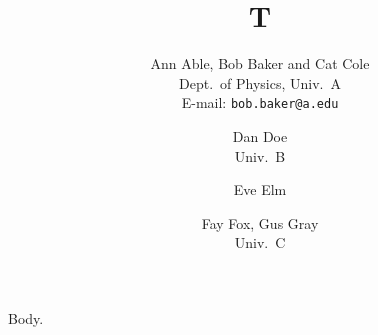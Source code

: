 \documentclass{article}
\title{T}
\author{Ann Able, Bob Baker and Cat Cole\\
  Dept.\ of Physics, Univ.\ A\\
  E-mail: \texttt{bob.baker@a.edu}
  \and Dan Doe\\ Univ.\ B
  \and Eve Elm \and Fay Fox, Gus Gray\\ Univ.\ C}
\begin{document}
\maketitle
Body.
\end{document}
